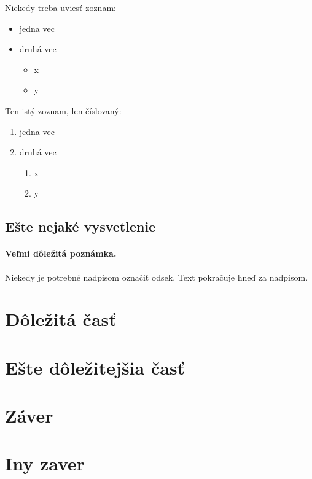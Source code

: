 \documentclass[10pt,twoside,slovak,a4paper]{article}
\begin{document}
Niekedy treba uviesť zoznam:

\begin{itemize}
\item jedna vec
\item druhá vec
	\begin{itemize}
	\item x
	\item y
	\end{itemize}
\end{itemize}

Ten istý zoznam, len číslovaný:

\begin{enumerate}
\item jedna vec
\item druhá vec
	\begin{enumerate}
	\item x
	\item y
	\end{enumerate}
\end{enumerate}


\subsection{Ešte nejaké vysvetlenie} \label{ina:este}

\paragraph{Veľmi dôležitá poznámka.}
Niekedy je potrebné nadpisom označiť odsek. Text pokračuje hneď za nadpisom.



\section{Dôležitá časť} \label{dolezita}




\section{Ešte dôležitejšia časť} \label{dolezitejsia}




\section{Záver} \label{zaver} %

\section{Iny zaver}






\end{document}
